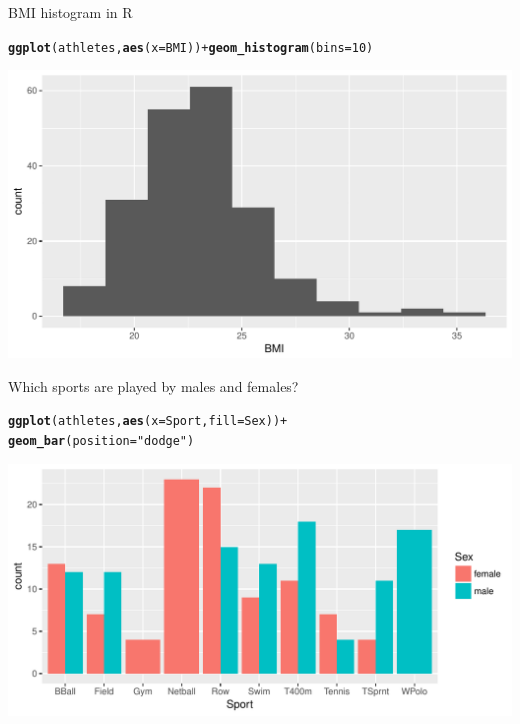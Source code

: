 \documentclass[unknownkeysallowed]{beamer}\usepackage[]{graphicx}\usepackage[]{color}
\makeatletter
\def\maxwidth{ %
  \ifdim\Gin@nat@width>\linewidth
    \linewidth
  \else
    \Gin@nat@width
  \fi
}
\newcommand{\hlnum}[1]{\textcolor[rgb]{0.686,0.059,0.569}{#1}}%
\newcommand{\hlstr}[1]{\textcolor[rgb]{0.192,0.494,0.8}{#1}}%
\newcommand{\hlopt}[1]{\textcolor[rgb]{0,0,0}{#1}}%
\newcommand{\hlstd}[1]{\textcolor[rgb]{0.345,0.345,0.345}{#1}}%
\newcommand{\hlkwc}[1]{\textcolor[rgb]{0.333,0.667,0.333}{#1}}%
\newcommand{\hlkwd}[1]{\textcolor[rgb]{0.737,0.353,0.396}{\textbf{#1}}}%
\newenvironment{kframe}{%
 \def\at@end@of@kframe{}%
 \ifinner\ifhmode%
  \def\at@end@of@kframe{\end{minipage}}%
  \begin{minipage}{\columnwidth}%
 \fi\fi%
 \def\FrameCommand##1{\hskip\@totalleftmargin \hskip-\fboxsep
 \colorbox{shadecolor}{##1}\hskip-\fboxsep
     \hskip-\linewidth \hskip-\@totalleftmargin \hskip\columnwidth}%
 \MakeFramed {\advance\hsize-\width
   \@totalleftmargin\z@ \linewidth\hsize
   \@setminipage}}%
 {\par\unskip\endMakeFramed%
 \at@end@of@kframe}
\newenvironment{knitrout}{}{} %
\makeatother
\begin{document}
\begin{frame}[fragile]{BMI histogram in R}
  
\begin{knitrout}
\color{fgcolor}\begin{kframe}
\begin{alltt}
\hlkwd{ggplot}\hlstd{(athletes,}\hlkwd{aes}\hlstd{(}\hlkwc{x}\hlstd{=BMI))}\hlopt{+}\hlkwd{geom_histogram}\hlstd{(}\hlkwc{bins}\hlstd{=}\hlnum{10}\hlstd{)}
\end{alltt}
\end{kframe}
\includegraphics[width=\maxwidth]{figure/unnamed-chunk-28-1} 

\end{knitrout}
  
\end{frame}

\begin{frame}[fragile]{Which sports are played by males and females?}
  

  
\begin{knitrout}
\color{fgcolor}\begin{kframe}
\begin{alltt}
\hlkwd{ggplot}\hlstd{(athletes,}\hlkwd{aes}\hlstd{(}\hlkwc{x}\hlstd{=Sport,}\hlkwc{fill}\hlstd{=Sex))}\hlopt{+}
  \hlkwd{geom_bar}\hlstd{(}\hlkwc{position}\hlstd{=}\hlstr{"dodge"}\hlstd{)}
\end{alltt}
\end{kframe}
\includegraphics[width=\maxwidth]{figure/unnamed-chunk-29-1} 

\end{knitrout}
  
\end{frame}
\end{document}
